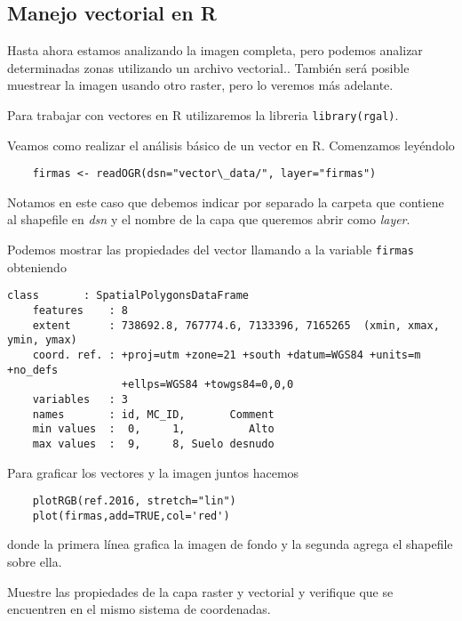 \subsection{Manejo vectorial en R}

Hasta ahora estamos analizando la imagen completa, pero podemos analizar
determinadas zonas utilizando un archivo vectorial.. Tambi\'en ser\'a
posible muestrear la imagen usando otro raster, pero lo veremos m\'as adelante.

Para trabajar con vectores en R utilizaremos la libreria
\texttt{library(rgal)}.

\begin{exa}
    Veamos como realizar el an\'alisis b\'asico de un vector en R. Comenzamos
    ley\'endolo

    \begin{lstlisting}
    firmas <- readOGR(dsn="vector\_data/", layer="firmas")
    \end{lstlisting}

    Notamos en este caso que debemos indicar por separado la carpeta que
    contiene al shapefile en \emph{dsn} y el nombre de la capa que queremos
    abrir como \emph{layer}.

    Podemos mostrar las propiedades del vector llamando a la variable
    \texttt{firmas} obteniendo
    \begin{Verbatim}[fontsize=\small]
    class       : SpatialPolygonsDataFrame
    features    : 8
    extent      : 738692.8, 767774.6, 7133396, 7165265  (xmin, xmax, ymin, ymax)
    coord. ref. : +proj=utm +zone=21 +south +datum=WGS84 +units=m +no_defs
                  +ellps=WGS84 +towgs84=0,0,0
    variables   : 3
    names       : id, MC_ID,       Comment
    min values  :  0,     1,          Alto
    max values  :  9,     8, Suelo desnudo
    \end{Verbatim}

    Para graficar los vectores y la imagen juntos hacemos

    \begin{lstlisting}
    plotRGB(ref.2016, stretch="lin")
    plot(firmas,add=TRUE,col='red')
    \end{lstlisting}
    donde la primera l\'inea grafica la imagen de fondo y la segunda agrega el
    shapefile sobre ella.
\end{exa}

\begin{act}
    Muestre las propiedades de la capa raster y vectorial y verifique
    que se encuentren en el mismo sistema de coordenadas.
\end{act}

